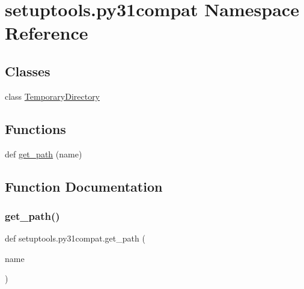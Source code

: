 \hypertarget{namespacesetuptools_1_1py31compat}{}\section{setuptools.\+py31compat Namespace Reference}
\label{namespacesetuptools_1_1py31compat}
\subsection*{Classes}
\begin{DoxyCompactItemize}
\item 
class \hyperlink{classsetuptools_1_1py31compat_1_1_temporary_directory}{Temporary\+Directory}
\end{DoxyCompactItemize}
\subsection*{Functions}
\begin{DoxyCompactItemize}
\item 
def \hyperlink{namespacesetuptools_1_1py31compat_a7542646cbc287c1878ab7d9320435f15}{get\+\_\+path} (name)
\end{DoxyCompactItemize}


\subsection{Function Documentation}
\mbox{\label{namespacesetuptools_1_1py31compat_a7542646cbc287c1878ab7d9320435f15}} 
\subsubsection{\texorpdfstring{get\+\_\+path()}{get\_path()}}
{\footnotesize\ttfamily def setuptools.\+py31compat.\+get\+\_\+path (\begin{DoxyParamCaption}\item[{}]{name }\end{DoxyParamCaption})}

